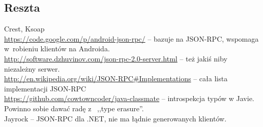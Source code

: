 \subsection{Reszta}
Crest, Ksoap \\
\url{https://code.google.com/p/android-json-rpc/} -- bazuje na JSON-RPC, wspomaga w~robieniu klientów na Androida.\\
\url{http://software.dzhuvinov.com/json-rpc-2.0-server.html} -- też jakiś niby niezależny serwer. \\ 
\url{http://en.wikipedia.org/wiki/JSON-RPC#Implementations} -- cała lista implementacji JSON-RPC \\
\url{https://github.com/cowtowncoder/java-classmate} -- introspekcja typów w Javie. Powinno sobie dawać radę z~ ,,type erasure''. \\
Jayrock -- JSON-RPC dla .NET, nie ma łądnie generowanych klientów.




%
%


